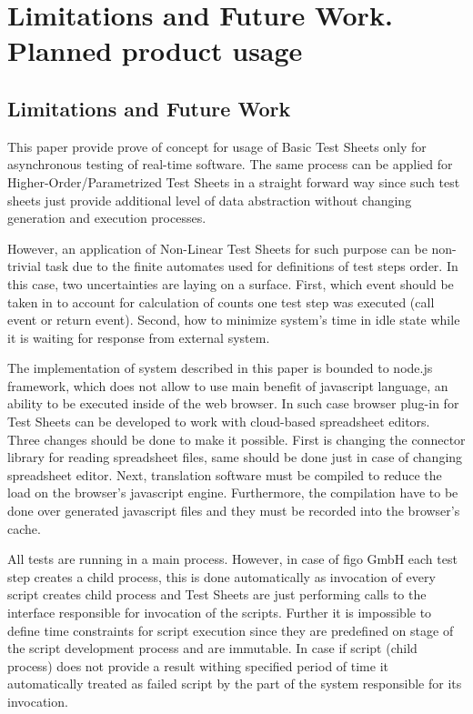 \chapter{Limitations and Future Work. Planned product usage}
\label{chap:limits}
\section{Limitations and Future Work}
This paper provide prove of concept for usage of Basic Test Sheets only for asynchronous testing of real-time software. The same process can be applied for Higher-Order/Parametrized Test Sheets in a straight forward way since such test sheets just provide additional level of data abstraction without changing generation and execution processes.

However, an application of Non-Linear Test Sheets for such purpose can be non-trivial task due to the finite automates used for definitions of test steps order. In this case, two uncertainties are laying on a surface. First, which event should be taken in to account for calculation of counts one test step was executed (call event or return event). Second, how to minimize system's time in idle state while it is waiting for response from external system.
 
The implementation  of system described in this paper is bounded to node.js framework, which does not allow to use main benefit of javascript language, an ability to be executed inside of the web browser. In such case browser plug-in for Test Sheets can be developed to work with cloud-based spreadsheet editors. Three changes should be done to make it possible. First is changing the connector library for reading spreadsheet files, same should be done just in case of changing spreadsheet editor. Next, translation software must be compiled to reduce the load on the browser's javascript engine. Furthermore, the compilation have to be done over generated javascript files and they must be recorded into the browser's cache.

All tests are running in a main process. However, in case of figo GmbH each test step creates a child process, this is done automatically as invocation of every script creates child process and Test Sheets are just performing calls to the interface responsible for invocation of the scripts. Further it is impossible to define time constraints for script execution since they are predefined on stage of the script development process and are immutable. In case if script (child process) does not provide a result withing specified period of time it automatically treated as failed script by the part of the system responsible for its invocation.

